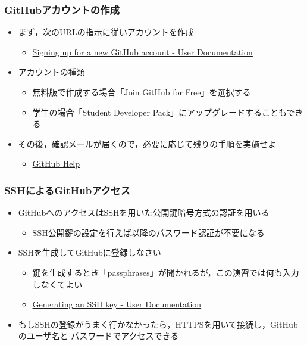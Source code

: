 \documentclass[a4paper,twoside,twocolumn]{bxjsarticle}
\begin{document}
\subsubsection{GitHubアカウントの作成}
\label{sec-2-1-2}
\begin{itemize}
\item まず，次のURLの指示に従いアカウントを作成
\begin{itemize}
\item \href{https://help.github.com/articles/signing-up-for-a-new-github-account/}{Signing up for a new GitHub account - User Documentation}
\end{itemize}
\item アカウントの種類
\begin{itemize}
\item 無料版で作成する場合「Join GitHub for Free」を選択する
\item 学生の場合「Student Developer Pack」にアップグレードすることもできる
\end{itemize}
\item その後，確認メールが届くので，必要に応じて残りの手順を実施せよ
\begin{itemize}
\item \href{https://help.github.com/categories/setup/}{GitHub Help}
\end{itemize}
\end{itemize}

\subsubsection{SSHによるGitHubアクセス}
\label{sec-2-1-3}
\begin{itemize}
\item GitHubへのアクセスはSSHを用いた公開鍵暗号方式の認証を用いる
\begin{itemize}
\item SSH公開鍵の設定を行えば以降のパスワード認証が不要になる
\end{itemize}
\item SSHを生成してGitHubに登録しなさい
\begin{itemize}
\item 鍵を生成するとき「passphrases」が聞かれるが，この演習では何も入力しなくてよい
\item \href{https://help.github.com/articles/generating-an-ssh-key/}{Generating an SSH key - User Documentation}
\end{itemize}
\item もしSSHの登録がうまく行かなかったら，HTTPSを用いて接続し，GitHubのユーザ名と
パスワードでアクセスできる
\end{itemize}
\end{document}
